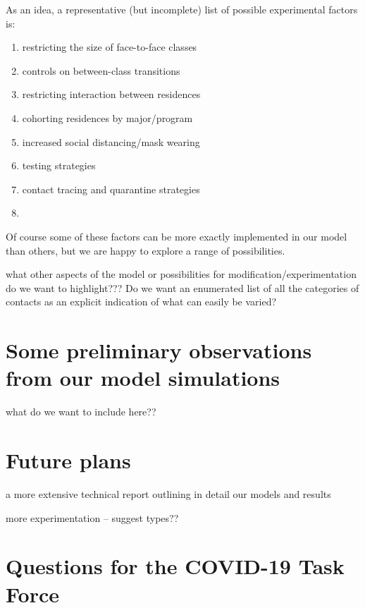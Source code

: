 \documentclass[fleqn,10pt]{SelfArx} %
\newcommand{\ed}[1]{{\color{blue} #1}}
\begin{document}
As an idea, a representative (but incomplete) list of possible experimental factors is:
\begin{enumerate}

   \item restricting the size of face-to-face classes

   \item controls on between-class transitions

    \item restricting interaction between residences

    \item cohorting residences by major/program

    \item increased social distancing/mask wearing

    \item testing strategies

    \item contact tracing and quarantine strategies

    \item 


\end{enumerate}
Of course some of these factors can be more exactly implemented in our model than others, but we are happy to explore a range of possibilities.

\ed{what other aspects of the model or possibilities for modification/experimentation do we want to highlight???  Do we want an enumerated list of all the categories of contacts as an explicit indication of what can easily be varied?}




\section{Some preliminary observations from our model simulations}
\label{sec:prelimresults}

\ed{what do we want to include here??}

\section{Future plans}

\ed{a more extensive technical report outlining in detail our models and results}

\ed{more experimentation -- suggest types??}


\section{Questions for the COVID-19 Task Force}
\end{document}
